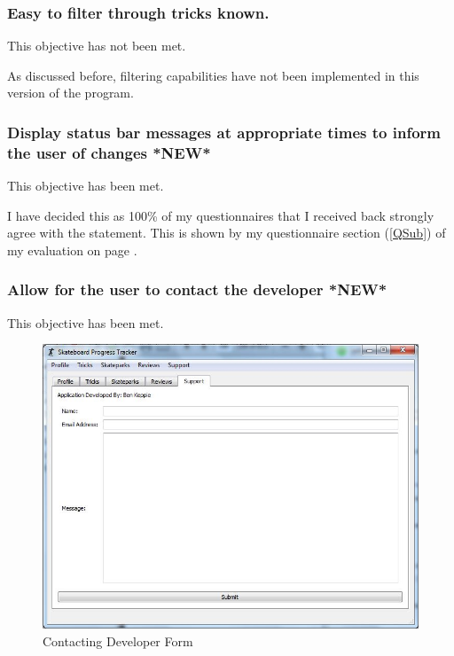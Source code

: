\subsubsection{ Easy to filter through tricks known.}

This objective has not been met. 

As discussed before, filtering capabilities have not been implemented in this version of the program.



\subsubsection {Display status bar messages at appropriate times to inform the user of changes *NEW*} %

This objective has been met.

I have decided this as 100\% of my questionnaires that I received back strongly agree with the statement. This is shown by my questionnaire section (\ref{QSub}) of my evaluation on page \pageref{QSub}.



\subsubsection {Allow for the user to contact the developer *NEW*}

This objective has been met.


\begin{figure}[H]
    \includegraphics[width=\textwidth]{./Evaluation/images/Contactsupport.jpg}
    \caption{Contacting Developer Form} \label{fig:ContactSupportEVD}
\end{figure}

